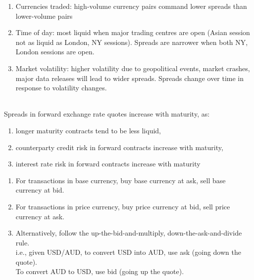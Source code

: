 \begin{remark} 
\begin{enumerate}[label=\roman*.]
\setlength{\itemsep}{0pt}
\item Currencies traded: high-volume currency pairs command lower spreads than lower-volume pairs
\item Time of day: most liquid when major trading centres are open (Asian session not as liquid as London, NY sessions). Spreads are narrower when both NY, London sessions are open.
\item Market volatility: higher volatility due to geopolitical events, market crashes, major data releases will lead to wider spreads. Spreads change over time in response to volatility changes.
\end{enumerate}
\end{remark}

\begin{remark} \\
Spreads in forward exchange rate quotes increase with maturity, as:
\begin{enumerate}[label=\roman*.]
\setlength{\itemsep}{0pt}
\item longer maturity contracts tend to be less liquid,
\item counterparty credit risk in forward contracts increase with maturity,
\item interest rate risk in forward contracts increase with maturity
\end{enumerate} 
\end{remark}

\begin{remark} 
\begin{enumerate}[label=\roman*.]
\setlength{\itemsep}{0pt}
\item For transactions in base currency, buy base currency at ask, sell base currency at bid.
\item For transactions in price currency, buy price currency at bid, sell price currency at ask.
\item Alternatively, follow the up-the-bid-and-multiply, down-the-ask-and-divide rule.\\
i.e., given USD/AUD, to convert USD into AUD, use ask (going down the quote).\\
To convert AUD to USD, use bid (going up the quote).
\end{enumerate}
\end{remark}

